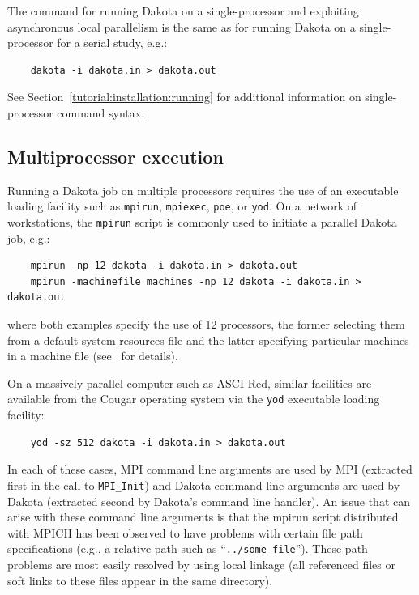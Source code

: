 The command for running Dakota on a single-processor and exploiting
asynchronous local parallelism is the same as for running Dakota on a
single-processor for a serial study, e.g.:
\begin{small}
\begin{verbatim}
    dakota -i dakota.in > dakota.out
\end{verbatim}
\end{small}

See Section~\ref{tutorial:installation:running} for additional
information on single-processor command syntax.

\subsection{Multiprocessor execution}\label{parallel:running:multiprocessor}

Running a Dakota job on multiple processors requires the use of an
executable loading facility such as \texttt{mpirun}, \texttt{mpiexec},
\texttt{poe}, or \texttt{yod}.  On a network of workstations, the
\texttt{mpirun} script is commonly used to initiate a parallel Dakota
job, e.g.:
\begin{small}
\begin{verbatim}
    mpirun -np 12 dakota -i dakota.in > dakota.out
    mpirun -machinefile machines -np 12 dakota -i dakota.in > dakota.out
\end{verbatim}
\end{small}
where both examples specify the use of 12 processors, the former
selecting them from a default system resources file and the latter
specifying particular machines in a machine file (see~\cite{Gro96} for
details).

On a massively parallel computer such as ASCI Red, similar facilities
are available from the Cougar operating system via the \texttt{yod}
executable loading facility:
\begin{small}
\begin{verbatim}
    yod -sz 512 dakota -i dakota.in > dakota.out
\end{verbatim}
\end{small}

In each of these cases, MPI command line arguments are used by MPI
(extracted first in the call to \texttt{MPI\_Init}) and Dakota command
line arguments are used by Dakota (extracted second by Dakota's
command line handler). An issue that can arise with these command line
arguments is that the mpirun script distributed with MPICH has been
observed to have problems with certain file path specifications (e.g.,
a relative path such as ``\texttt{../some\_file}''). These path
problems are most easily resolved by using local linkage (all
referenced files or soft links to these files appear in the same
directory).

